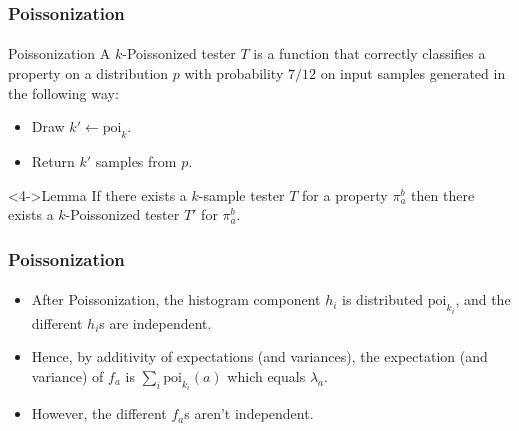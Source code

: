 \documentclass[handout]{beamer}
\begin{document}
\begin{frame}
  \frametitle{Poissonization} \framesubtitle{}

  \begin{block}{Poissonization}
    A $k$-Poissonized tester $T$ is a function that correctly
    classifies a property on a distribution $p$ with probability
    $7/12$ on input samples generated in the following way:
    \begin{itemize}
    \item<2-> Draw $k'\leftarrow \mbox{poi}_k$.
    \item<3-> Return $k'$ samples from $p$.
    \end{itemize}
  \end{block}

  \begin{block}<4->{Lemma}
    If there exists a $k$-sample tester $T$ for a property $\pi_a^b$
    then there exists a $k$-Poissonized tester $T'$ for $\pi_a^b$.
  \end{block}
  
\end{frame}

\begin{frame}
  \frametitle{Poissonization} \framesubtitle{}

  
  \begin{itemize}
  \item<1-> After Poissonization, the histogram component $h_i$ is
    distributed $\mbox{poi}_{k_i}$, and the different $h_i$s are independent.
  \item<2-> Hence, by additivity of expectations (and variances), the
    expectation (and variance) of $f_a$ is $\sum_i\mbox{poi}_{k_i}(a)$
    which equals $\lambda_a$.

  \item<3-> However, the different $f_a$s aren't independent.
 \end{itemize}
  
\end{frame}
\end{document}
